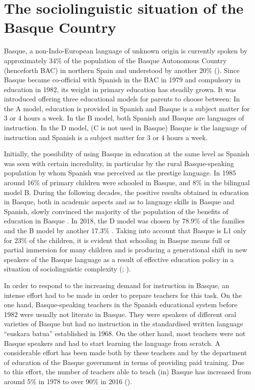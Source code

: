 \documentclass[output=paper]{../langscibook}
\begin{document}
\section{The sociolinguistic situation of the Basque Country}


Basque, a non-Indo-European language of unknown origin is currently spoken by approximately 34\% of the population of the Basque Autonomous Country (henceforth BAC) in northern Spain and understood by another 20\% (\citealt{BasqueGovernment2017}). Since Basque became co-official with Spanish in the BAC in 1979 and compulsory in education in 1982, its weight in primary education has steadily grown. It was introduced offering three educational models for parents to choose between: In the A model, education is provided in Spanish and Basque is a subject matter for 3 or 4 hours a week. In the B model, both Spanish and Basque are languages of instruction. In the D model, (C is not used in Basque) Basque is the language of instruction and Spanish is a subject matter for 3 or 4 hours a week.

Initially, the possibility of using Basque in education at the same level as Spanish was seen with certain incredulity, in particular by the rural Basque-speaking population by whom Spanish was perceived as the prestige language. In 1985 around 16\% of primary children were schooled in Basque, and 8\% in the bilingual model B. During the following decades, the positive results obtained in education in Basque, both in academic aspects and as to language skills in Basque and Spanish, slowly convinced the majority of the population of the benefits of education in Basque \citep{Cenoz2009}. In 2018, the D model was chosen by 78.9\% of the families and the B model by another 17.3\% \citep{BasqueGovernment2018}. Taking into account that Basque is L1 only for 23\% of the children, it is evident that schooling in Basque means full or partial immersion for many children and is producing a generational shift in new speakers of the Basque language as a result of effective education policy in a situation of sociolinguistic complexity (\citealt{AmorrortuEtAl2009};  \citealt{OrtegaEtAl2015}).

 In order to respond to the increasing demand for instruction in Basque, an intense effort had to be made in order to prepare teachers for this task. On the one hand, Basque-speaking teachers in the Spanish educational system before 1982 were usually not literate in Basque. They were speakers of different oral varieties of Basque but had no instruction in the standardised written language “euskara batua” established in 1968. On the other hand, most teachers were not Basque speakers and had to start learning the language from scratch. A considerable effort has been made both by these teachers and by the department of education of the Basque government in terms of providing paid training. Due to this effort, the number of teachers able to teach (in) Basque has increased from around 5\% in 1978 to over 90\% in 2016 (\citealt{BasqueGovernment2017}).
\end{document}
